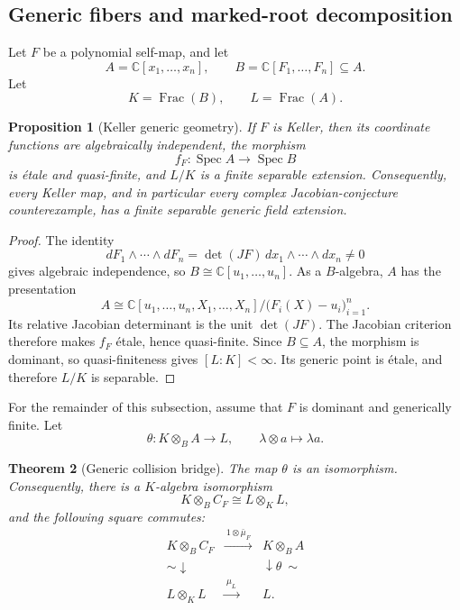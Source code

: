 \documentclass[11pt]{article}
\newtheorem{theorem}{Theorem}[section]
\newtheorem{proposition}[theorem]{Proposition}
\theoremstyle{remark}
\theoremstyle{definition}
\DeclareMathOperator{\Spec}{Spec}
\DeclareMathOperator{\Frac}{Frac}
\newcommand{\C}{\mathbb C}
\begin{document}
\subsection{Generic fibers and marked-root decomposition}
\label{sec:generic-galois-bridge}

Let \(F\) be a polynomial self-map, and let
\[
  A=\C[x_1,\dots,x_n],
  \qquad
  B=\C[F_1,\dots,F_n]\subseteq A.
\]
Let
\[
  K=\Frac(B),
  \qquad
  L=\Frac(A).
\]

\begin{proposition}[Keller generic geometry]
\label{prop:keller-generic-geometry}
If \(F\) is Keller, then its coordinate functions are algebraically
independent, the morphism
\[
  f_F\colon\Spec A\longrightarrow\Spec B
\]
is \'etale and quasi-finite, and \(L/K\) is a finite separable extension.
Consequently, every Keller map, and in particular every complex
Jacobian-conjecture counterexample, has a finite separable generic field
extension.
\end{proposition}

\begin{proof}
The identity
\[
  dF_1\wedge\cdots\wedge dF_n
  =\det(JF)\,dx_1\wedge\cdots\wedge dx_n\neq0
\]
gives algebraic independence, so
\(B\cong\C[u_1,\dots,u_n]\).  As a \(B\)-algebra, \(A\) has the
presentation
\[
  A\cong
  \C[u_1,\dots,u_n,X_1,\dots,X_n]
  \big/\bigl(F_i(X)-u_i\bigr)_{i=1}^n.
\]
Its relative Jacobian determinant is the unit \(\det(JF)\).  The Jacobian
criterion therefore makes \(f_F\) \'etale, hence quasi-finite.  Since
\(B\subseteq A\), the morphism is dominant, so quasi-finiteness gives
\([L:K]<\infty\).  Its generic point is \'etale, and therefore \(L/K\) is
separable.
\end{proof}

For the remainder of this subsection, assume that \(F\) is dominant and
generically finite.  Let
\[
  \theta\colon K\otimes_BA\longrightarrow L,
  \qquad
  \lambda\otimes a\longmapsto\lambda a.
\]

\begin{theorem}[Generic collision bridge]
\label{thm:generic-collision-base-change}
The map \(\theta\) is an isomorphism.  Consequently, there is a
\(K\)-algebra isomorphism
\[
  K\otimes_BC_F
  \cong
  L\otimes_KL,
\]
and the following square commutes:
\[
  \begin{array}{ccc}
    K\otimes_BC_F
      &\xrightarrow{\ 1\otimes\bar\mu_F\ }&
    K\otimes_BA\\
    {\scriptstyle\sim}\downarrow
      &&\downarrow{\scriptstyle\theta\ \sim}\\
    L\otimes_KL
      &\xrightarrow{\ \mu_L\ }&
    L.
  \end{array}
\]
\end{theorem}
\end{document}
